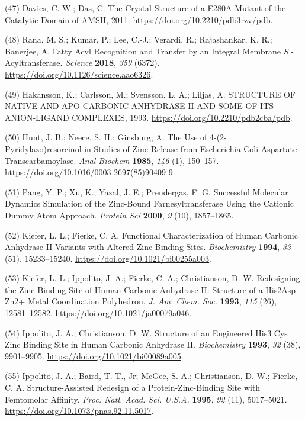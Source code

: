 \documentclass[  ASAPversion,
  ,
  9pt]{elife}
\newenvironment{cslreferences}%
  {}%
  {\par}
\begin{document}
\begin{cslreferences}
\leavevmode\hypertarget{ref-wW700ShK}{}%
(47) Davies, C. W.; Das, C. The Crystal Structure of a E280A Mutant of the Catalytic Domain of AMSH, 2011. \url{https://doi.org/10.2210/pdb3rzv/pdb}.

\leavevmode\hypertarget{ref-RFwEiPTW}{}%
(48) Rana, M. S.; Kumar, P.; Lee, C.-J.; Verardi, R.; Rajashankar, K. R.; Banerjee, A. Fatty Acyl Recognition and Transfer by an Integral Membrane \emph{S} -Acyltransferase. \emph{Science} \textbf{2018}, \emph{359} (6372). \url{https://doi.org/10.1126/science.aao6326}.

\leavevmode\hypertarget{ref-jyFnBdWm}{}%
(49) Hakansson, K.; Carlsson, M.; Svensson, L. A.; Liljas, A. STRUCTURE OF NATIVE AND APO CARBONIC ANHYDRASE II AND SOME OF ITS ANION-LIGAND COMPLEXES, 1993. \url{https://doi.org/10.2210/pdb2cba/pdb}.

\leavevmode\hypertarget{ref-13XuOF3Jj}{}%
(50) Hunt, J. B.; Neece, S. H.; Ginsburg, A. The Use of 4-(2-Pyridylazo)resorcinol in Studies of Zinc Release from Escherichia Coli Aspartate Transcarbamoylase. \emph{Anal Biochem} \textbf{1985}, \emph{146} (1), 150--157. \url{https://doi.org/10.1016/0003-2697(85)90409-9}.

\leavevmode\hypertarget{ref-pchdLF0k}{}%
(51) Pang, Y. P.; Xu, K.; Yazal, J. E.; Prendergas, F. G. Successful Molecular Dynamics Simulation of the Zinc-Bound Farnesyltransferase Using the Cationic Dummy Atom Approach. \emph{Protein Sci} \textbf{2000}, \emph{9} (10), 1857--1865.

\leavevmode\hypertarget{ref-D3VQQdjb}{}%
(52) Kiefer, L. L.; Fierke, C. A. Functional Characterization of Human Carbonic Anhydrase II Variants with Altered Zinc Binding Sites. \emph{Biochemistry} \textbf{1994}, \emph{33} (51), 15233--15240. \url{https://doi.org/10.1021/bi00255a003}.

\leavevmode\hypertarget{ref-w3tzhp92}{}%
(53) Kiefer, L. L.; Ippolito, J. A.; Fierke, C. A.; Christianson, D. W. Redesigning the Zinc Binding Site of Human Carbonic Anhydrase II: Structure of a His2Asp-Zn2+ Metal Coordination Polyhedron. \emph{J. Am. Chem. Soc.} \textbf{1993}, \emph{115} (26), 12581--12582. \url{https://doi.org/10.1021/ja00079a046}.

\leavevmode\hypertarget{ref-iu33cNMg}{}%
(54) Ippolito, J. A.; Christianson, D. W. Structure of an Engineered His3 Cys Zinc Binding Site in Human Carbonic Anhydrase II. \emph{Biochemistry} \textbf{1993}, \emph{32} (38), 9901--9905. \url{https://doi.org/10.1021/bi00089a005}.

\leavevmode\hypertarget{ref-148Si7kTL}{}%
(55) Ippolito, J. A.; Baird, T. T., Jr; McGee, S. A.; Christianson, D. W.; Fierke, C. A. Structure-Assisted Redesign of a Protein-Zinc-Binding Site with Femtomolar Affinity. \emph{Proc. Natl. Acad. Sci. U.S.A.} \textbf{1995}, \emph{92} (11), 5017--5021. \url{https://doi.org/10.1073/pnas.92.11.5017}.


\end{cslreferences}
\end{document}
